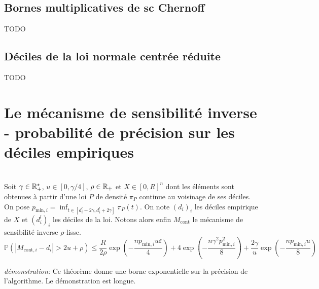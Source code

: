 \subsection{Bornes multiplicatives de {sc Chernoff}}\label{chern}

TODO

\subsection{Déciles de la loi normale centrée réduite}

TODO

\section{Le mécanisme de sensibilité inverse - probabilité de précision sur les déciles empiriques}\label{SI_empi}


\theoreme{}\\
Soit \(\gamma \in \mathbb{R}_+^\star\), \(u \in [0, \gamma/4]\), \(\rho \in \mathbb{R}_+\) et \(X \in [0,R]^n\) dont les éléments sont obtenues à partir d'une loi \(P\) de densité \(\pi_P\) continue au voisinage de ses déciles. On pose \(p_{\text{min}, i} = \inf_{t \in [d_i^l - 2\gamma, d_i^l + 2\gamma]} \pi_P(t)\). On note \((d_i)_i\) les déciles empirique de \(X\) et \((d_i^l)_i\) les déciles de la loi. Notons alors enfin \(M_{\text{cont}}\) le mécanisme de sensibilité inverse \(\rho\)-lisse.
\[
    \mathbb P\left( |M_{\text{cont}, i} - d_i| > 2u + \rho\right) \leq \dfrac{R}{2\rho}\exp\left(- \dfrac{np_{\text{min}, i}u\varepsilon}{4} \right) + 4\exp\left(- \dfrac{n\gamma^2p_{\text{min},i}^2}{8} \right) + \dfrac{2\gamma}{u}\exp\left( -\dfrac{np_{\text{min},i}u}{8} \right)
\]


\textit{démonstration:} Ce théorème donne une borne exponentielle sur la précision de l'algorithme. Le démonstration est longue.\\

